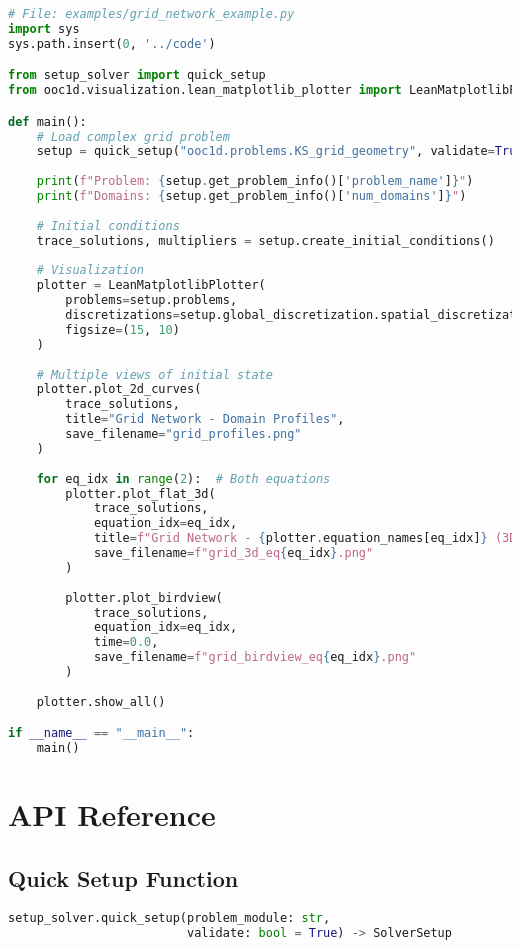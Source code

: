 \documentclass[11pt,a4paper]{article}
\begin{document}
\begin{lstlisting}[language=Python, caption={Grid Network Example}]
# File: examples/grid_network_example.py
import sys
sys.path.insert(0, '../code')

from setup_solver import quick_setup
from ooc1d.visualization.lean_matplotlib_plotter import LeanMatplotlibPlotter

def main():
    # Load complex grid problem
    setup = quick_setup("ooc1d.problems.KS_grid_geometry", validate=True)
    
    print(f"Problem: {setup.get_problem_info()['problem_name']}")
    print(f"Domains: {setup.get_problem_info()['num_domains']}")
    
    # Initial conditions
    trace_solutions, multipliers = setup.create_initial_conditions()
    
    # Visualization
    plotter = LeanMatplotlibPlotter(
        problems=setup.problems,
        discretizations=setup.global_discretization.spatial_discretizations,
        figsize=(15, 10)
    )
    
    # Multiple views of initial state
    plotter.plot_2d_curves(
        trace_solutions, 
        title="Grid Network - Domain Profiles",
        save_filename="grid_profiles.png"
    )
    
    for eq_idx in range(2):  # Both equations
        plotter.plot_flat_3d(
            trace_solutions,
            equation_idx=eq_idx,
            title=f"Grid Network - {plotter.equation_names[eq_idx]} (3D)",
            save_filename=f"grid_3d_eq{eq_idx}.png"
        )
        
        plotter.plot_birdview(
            trace_solutions,
            equation_idx=eq_idx,
            time=0.0,
            save_filename=f"grid_birdview_eq{eq_idx}.png"
        )
    
    plotter.show_all()

if __name__ == "__main__":
    main()
\end{lstlisting}

\section{API Reference}

\subsection{Quick Setup Function}

\begin{lstlisting}[language=Python, caption={Quick Setup API}]
setup_solver.quick_setup(problem_module: str, 
                         validate: bool = True) -> SolverSetup
\end{lstlisting}
\end{document}
